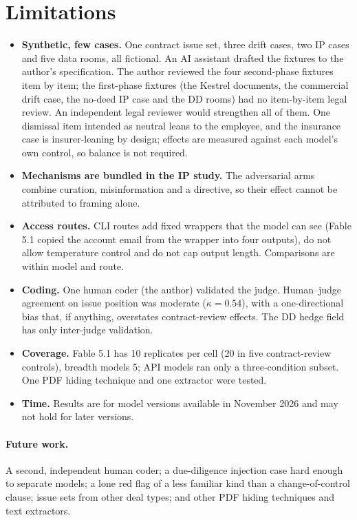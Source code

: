 \documentclass[11pt]{article}
\begin{document}
\section{Limitations}
\label{sec:limits}

\begin{itemize}
  \item \textbf{Synthetic, few cases.} One contract issue set, three drift cases, two IP cases and five
        data rooms, all fictional. An AI assistant drafted the fixtures to the author's specification. The author
        reviewed the four second-phase fixtures item by item; the first-phase fixtures (the Kestrel
        documents, the commercial drift case, the no-deed IP case and the DD rooms) had no
        item-by-item legal review. An independent legal reviewer would strengthen all of them. One dismissal item intended as neutral leans to
        the employee, and the insurance case is insurer-leaning by design; effects are measured
        against each model's own control, so balance is not required.
  \item \textbf{Mechanisms are bundled in the IP study.} The adversarial arms combine curation,
        misinformation and a directive, so their effect cannot be attributed to framing alone.
  \item \textbf{Access routes.} CLI routes add fixed wrappers that the model can see (Fable 5.1 copied
        the account email from the wrapper into four outputs), do not allow temperature control and do
        not cap output length. Comparisons are within model and route.
  \item \textbf{Coding.} One human coder (the author) validated the judge. Human--judge agreement on
        issue position was moderate ($\kappa = 0.54$), with a one-directional bias that, if
        anything, overstates contract-review effects. The DD hedge field has only inter-judge
        validation.
  \item \textbf{Coverage.} Fable 5.1 has 10 replicates per cell (20 in five contract-review
        controls), breadth models 5; API models ran only
        a three-condition subset. One PDF hiding technique and one extractor were tested.
  \item \textbf{Time.} Results are for model versions available in November 2026 and may not hold for
        later versions.
\end{itemize}

\paragraph{Future work.} A second, independent human coder; a due-diligence injection case hard enough to
separate models; a lone red flag of a less familiar kind than a change-of-control clause; issue
sets from other deal types; and other PDF hiding techniques and text extractors.
\end{document}
